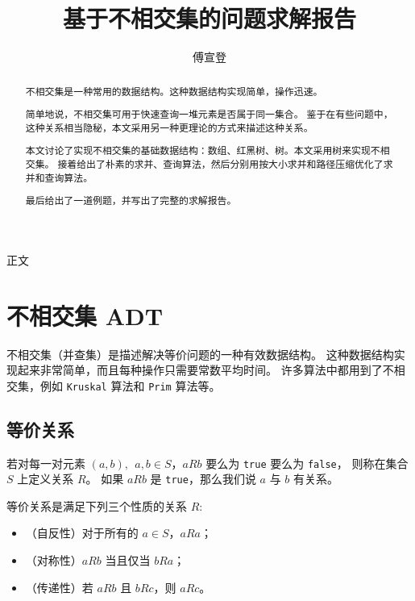 \documentclass[withoutpreface,bwprint]{cumcmthesis}
\title{基于不相交集的问题求解报告}
\author{傅宣登}
\begin{document}
\maketitle
\begin{abstract}

不相交集是一种常用的数据结构。这种数据结构实现简单，操作迅速。

简单地说，不相交集可用于快速查询一堆元素是否属于同一集合。
鉴于在有些问题中，这种关系相当隐秘，本文采用另一种更理论的方式来描述这种关系。

本文讨论了实现不相交集的基础数据结构：数组、红黑树、树。本文采用树来实现不相交集。
接着给出了朴素的求并、查询算法，然后分别用按大小求并和路径压缩优化了求并和查询算法。

最后给出了一道例题，并写出了完整的求解报告。

\end{abstract}

\begin{center}%
	{\heiti 正文 \vspace{-.5em}}%
\end{center}%

\section{不相交集 ADT}

不相交集（并查集）是描述解决等价问题的一种有效数据结构。
这种数据结构实现起来非常简单，而且每种操作只需要常数平均时间。
许多算法中都用到了不相交集，例如 \verb|Kruskal| 算法和 \verb|Prim| 算法等。

\subsection{等价关系}

若对每一对元素 $(a, b),\ \ a,b \in S$，$aRb$ 要么为 \verb|true| 要么为 \verb|false|，
则称在集合 $S$ 上定义关系 $R$。
如果 $aRb$ 是 \verb|true|，那么我们说 $a$ 与 $b$ 有关系。

\begin{definition}[等价关系]
等价关系是满足下列三个性质的关系 $R$:
\begin{itemize}
\item （自反性）对于所有的 $a\in S$，$aRa$；
\item （对称性）$aRb$ 当且仅当 $bRa$；
\item （传递性）若 $aRb$ 且 $bRc$，则 $aRc$。
\end{itemize}
\end{definition}
\end{document}

